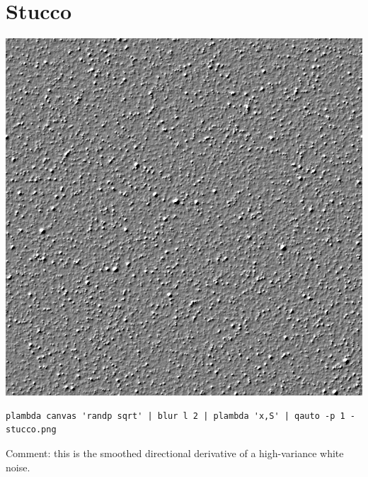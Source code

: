 \section{Stucco}
\includegraphics{stucco.png}
\begin{verbatim}
plambda canvas 'randp sqrt' | blur l 2 | plambda 'x,S' | qauto -p 1 - stucco.png
\end{verbatim}
Comment: this is the smoothed directional derivative of a high-variance white
noise.

